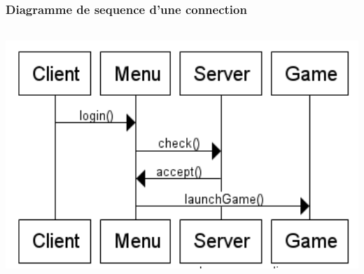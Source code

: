 \documentclass[10pt,a4paper]{article}
\begin{document}
\subsubsection{Diagramme de sequence d'une connection}
  \includegraphics[height=9.5cm,width=16cm]{sequence.png} 

\newpage


\printindex
\end{document}
